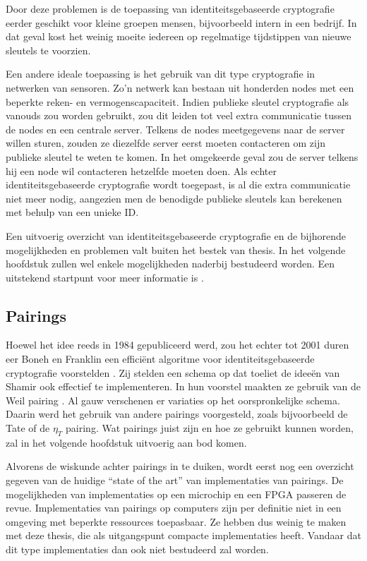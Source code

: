 Door deze problemen is de toepassing van identiteitsgebaseerde cryptografie eerder geschikt voor kleine groepen mensen, bijvoorbeeld intern in een bedrijf. In dat geval kost het weinig moeite iedereen op regelmatige tijdstippen van nieuwe sleutels te voorzien.

Een andere ideale toepassing is het gebruik van dit type cryptografie in netwerken van sensoren. Zo'n netwerk kan bestaan uit honderden nodes met een beperkte reken- en vermogenscapaciteit. Indien publieke sleutel cryptografie als vanouds zou worden gebruikt, zou dit leiden tot veel extra communicatie tussen de nodes en een centrale server. Telkens de nodes meetgegevens naar de server willen sturen, zouden ze diezelfde server eerst moeten contacteren om zijn publieke sleutel te weten te komen. In het omgekeerde geval zou de server telkens hij een node wil contacteren hetzelfde moeten doen.  Als echter identiteitsgebaseerde cryptografie wordt toegepast, is al die extra communicatie niet meer nodig, aangezien men de benodigde publieke sleutels kan berekenen met behulp van een unieke ID.

Een uitvoerig overzicht van identiteitsgebaseerde cryptografie en de bijhorende mogelijkheden en problemen valt buiten het bestek van thesis. In het volgende hoofdstuk zullen wel enkele mogelijkheden naderbij bestudeerd worden. Een uitstekend startpunt voor meer informatie is \cite{maas}.

\subsection{Pairings\label{inleiding-pairings}}

Hoewel het idee reeds in 1984 gepubliceerd werd, zou het echter tot 2001 duren eer Boneh en Franklin een effici\"ent algoritme voor identiteitsgebaseerde cryptografie voorstelden \cite{boneh}. Zij stelden een schema op dat toeliet de idee\"en van Shamir ook effectief te implementeren. In hun voorstel maakten ze gebruik van de Weil pairing \cite{weil}. Al gauw verschenen er variaties op het oorspronkelijke schema. Daarin werd het gebruik van andere pairings voorgesteld, zoals bijvoorbeeld de Tate \cite{tate} of de $\eta_T$ \cite{eta} pairing. Wat pairings juist zijn en hoe ze gebruikt kunnen worden, zal in het volgende hoofdstuk uitvoerig aan bod komen.

Alvorens de wiskunde achter pairings in te duiken, wordt eerst nog een overzicht gegeven van de huidige ``state of the art'' van implementaties van pairings. De mogelijkheden van implementaties op een microchip en een FPGA passeren de revue. Implementaties van pairings op computers zijn per definitie niet in een omgeving met beperkte ressources toepasbaar. Ze hebben dus weinig te maken met deze thesis, die als uitgangspunt compacte implementaties heeft. Vandaar dat dit type implementaties dan ook niet bestudeerd zal worden.

